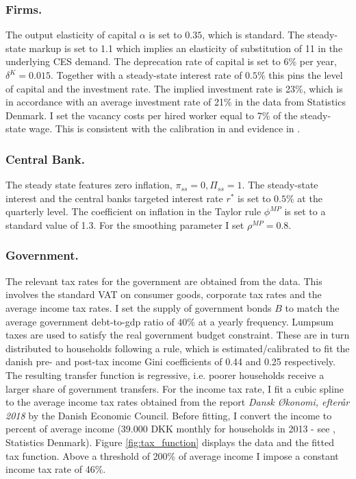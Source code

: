 \subsubsection*{Firms.} The output elasticity of capital $\alpha$ is set to $0.35$, which is standard. The steady-state markup is set to 1.1 which implies an elasticity of substitution of 11 in the underlying CES demand. The deprecation rate of capital is set to 6\% per year, $\delta^K=0.015$. Together with a steady-state interest rate of $0.5\%$ this pins the level of capital and the investment rate. The implied investment rate is 23\%, which is in accordance with an average investment rate of 21\% in the data from Statistics Denmark. I set the vacancy costs per hired worker equal to 7\% of the steady-state wage. This is consistent with the calibration in \citet{christiano2016unemployment} and evidence in \citet{silva2009labor}. 


\subsubsection*{Central Bank.} The steady state features zero inflation, $\pi_{ss} = 0, \Pi_{ss} = 1$. The steady-state interest and the central banks targeted interest rate $r^*$ is set to $0.5\%$ at the quarterly level. The coefficient on inflation in the Taylor rule $\phi^{MP}$ is set to a standard value of 1.3. For the smoothing parameter I set $\rho^{MP} = 0.8$.  


\subsubsection*{Government.} The relevant tax rates for the government are obtained from the data. This involves the standard VAT on consumer goods, corporate tax rates and the average income tax rates. I set the supply of government bonds $B$ to match the average government debt-to-gdp ratio of $40\%$ at a yearly frequency. Lumpsum taxes are used to satisfy the real government budget constraint. These are in turn distributed to households following a rule, which is estimated/calibrated to fit the danish pre- and post-tax income Gini coefficients of 0.44 and 0.25 respectively. The resulting transfer function is regressive, i.e. poorer households receive a larger share of government transfers. 
For the income tax rate, I fit a cubic spline to the average income tax rates obtained from the report \textit{Dansk Økonomi, efterår 2018} by the Danish Economic Council. Before fitting, I convert the income to percent of average income (39.000 DKK monthly for households in 2013 - see \citet{Indkomster2014DST}, Statistics Denmark). Figure \ref{fig:tax_function} displays the data and the fitted tax function. Above a threshold of 200\% of average income I impose a constant income tax rate of 46\%.  


